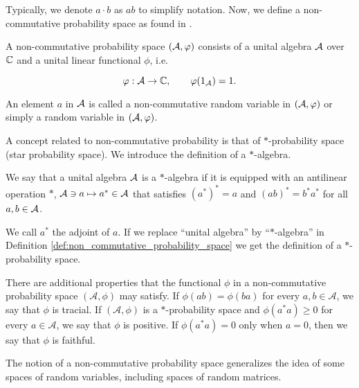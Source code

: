 Typically, we denote \(a \cdot b\) as \(ab\) to simplify notation. Now, we define a non-commutative probability space as found in \cite{book:nica_speicher}.

\begin{definition} \label{def:non_commutative_probability_space}
    A non-commutative probability space $(\mathcal A,\varphi)$ consists of a unital algebra $\mathcal A$ over $\mathbb C$ and a unital linear functional $\phi$, i.e.

    \begin{equation*}
        \varphi : \mathcal A \to \mathbb C, \qquad \varphi(1_\mathcal A) = 1.
    \end{equation*}
\end{definition}
An element $a$ in $\mathcal A$ is called a non-commutative random variable in $(\mathcal A, \varphi)$ or simply a random variable in $(\mathcal A,\varphi)$.

    A concept related to non-commutative probability is that of $*$-probability space (star probability space). We introduce the definition of a $*$-algebra.

    \begin{definition}[$*$-Algebra]
        We say that a unital algebra $\mathcal A$ is a $*$-algebra if it is equipped with an antilinear operation $*$, $\mathcal A \ni a \mapsto a^* \in \mathcal A$ that satisfies $(a^*)^* = a$ and $(ab)^* = b^* a^*$ for all $a,b \in \mathcal A$.
    \end{definition}

    We call $a^*$ the adjoint of $a$. If we replace ``unital algebra'' by ``$*$-algebra'' in Definition \ref{def:non_commutative_probability_space} we get the definition of a $*$-probability space.


    There are additional properties that the functional \(\phi\) in a non-commutative probability space \((\mathcal{A}, \phi)\) may satisfy. If \(\phi(ab) = \phi(ba)\) for every \(a, b \in \mathcal{A}\), we say that \(\phi\) is tracial. If \((\mathcal{A}, \phi)\) is a \(*\)-probability space and \(\phi(a^*a) \geq 0\) for every \(a \in \mathcal{A}\), we say that \(\phi\) is positive. If \(\phi(a^*a) = 0\) only when \(a = 0\), then we say that \(\phi\) is faithful.


    The notion of a non-commutative probability space generalizes the idea of some spaces of random variables, including spaces of random matrices.

